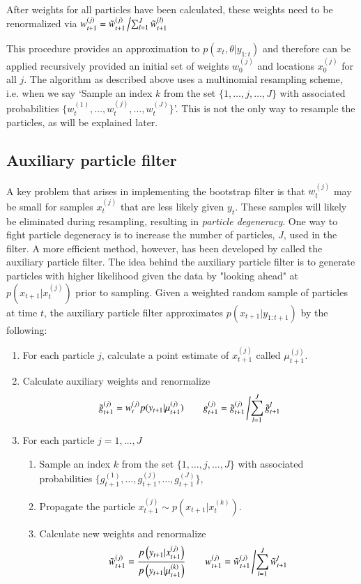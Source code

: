 \documentclass{elsarticle}
\begin{document}
\noindent After weights for all particles have been calculated, these weights need to be renormalized via $w_{t+1}^{(j)} = \tilde{w}_{t+1}^{(j)}\left/ \sum_{l=1}^J \tilde{w}_{t+1}^{(l)} \right.$

This procedure provides an approximation to $p(x_t,\theta| y_{1:t})$ and therefore can be applied recursively provided an initial set of weights $w_0^{(j)}$ and locations $x_0^{(j)}$ for all $j$.  The algorithm as described above uses a multinomial resampling scheme, i.e. when we say `Sample an index $k$ from the set $\{1,\ldots,j,\ldots,J\}$ with associated probabilities $\{w_t^{(1)},\ldots,w_t^{(j)},\ldots,w_t^{(J)}\}$'.  This is not the only way to resample the particles, as will be explained later.

\subsection{Auxiliary particle filter}

A key problem that arises in implementing the bootstrap filter is that $w_t^{(j)}$ may be small for samples $x_t^{(j)}$ that are less likely given $y_t$. These samples will likely be eliminated during resampling, resulting in \emph{particle degeneracy}. One way to fight particle degeneracy is to increase the number of particles, $J$, used in the filter. A more efficient method, however, has been developed by \citet{Pitt:Shep:filt:1999} called the auxiliary particle filter.  The idea behind the auxiliary particle filter is to generate particles with higher likelihood given the data by "looking ahead" at $p(x_{t+1}|x_t^{(j)})$ prior to sampling. Given a weighted random sample of particles at time $t$, the auxiliary particle filter approximates $p(x_{t+1}|y_{1:t+1})$ by the following:

\begin{enumerate}
\item For each particle $j$, calculate a point estimate of $x_{t+1}^{(j)}$ called $\mu_{t+1}^{(j)}$.  %
\item Calculate auxiliary weights and renormalize
\[ \tilde{g}_{t+1}^{(j)} = w_t^{(j)} p(y_{t+1}|\mu_{t+1}^{(j)}) \qquad g_{t+1}^{(j)} = \tilde{g}_{t+1}^{(j)}\left/\sum_{l=1}^J \tilde{g}_{t+1}^l\right. \]
\item For each particle $j=1,\ldots,J$
	\begin{enumerate}
    \item Sample an index $k$ from the set $\{1,\ldots,j,\ldots,J\}$ with associated probabilities $\{g_{t+1}^{(1)},\ldots,g_{t+1}^{(j)},\ldots,g_{t+1}^{(J)}\}$,
	\item Propagate the particle $x_{t+1}^{(j)}\sim p\left(x_{t+1}|x_t^{(k)}\right)$.
	\item Calculate new weights and renormalize
\[\tilde{w}_{t+1}^{(j)} = \frac{p\left(y_{t+1}|x_{t+1}^{(j)}\right)}{p\left(y_{t+1}|\mu_{t+1}^{(k)}\right)} \qquad w_{t+1}^{(j)} = \tilde{w}_{t+1}^{(j)}\left/\sum_{l=1}^J \tilde{w}_{t+1}^l \right.\]
	\end{enumerate}
\end{enumerate}
\end{document}
